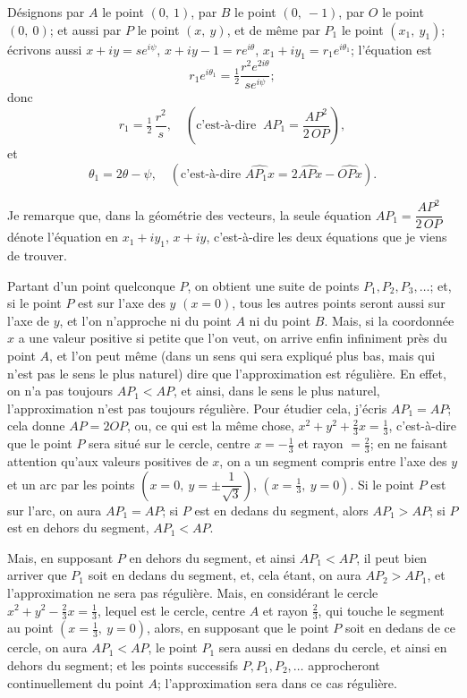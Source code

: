 \documentclass[11pt,a4paper]{article}
\begin{document}
Désignons par $A$ le point $(0,\ 1)$, par $B$ le point $(0,\ -1)$, par $O$ le point $(0,\ 0)$; et aussi par $P$ le point $(x,\ y)$, et de même par $P_1$ le point $(x_1,\ y_1)$; écrivons aussi $x + iy = s e^{i\psi}$, $x + iy - 1 = r e^{i\theta}$, $x_1 + i y_1 = r_1 e^{i\theta_1}$; l'équation est
\[
r_1 e^{i\theta_1} = \tfrac{1}{2} \frac{r^2 e^{2i\theta}}{s e^{i\psi}};
\]
donc
\[
r_1 = \tfrac{1}{2}\,\frac{r^2}{s},\quad (\text{c'est-à-dire }\ AP_1 = \frac{AP^2}{2\,OP}),
\]
et
\[
\theta_1 = 2\theta - \psi,\quad (\text{c'est-à-dire }\widehat{AP_1 x} = 2\widehat{APx} - \widehat{OPx}).
\]

Je remarque que, dans la géométrie des vecteurs, la seule équation $AP_1 = \dfrac{AP^2}{2\,OP}$ dénote l'équation en $x_1 + i y_1$, $x + iy$, c'est-à-dire les deux équations que je viens de trouver.

Partant d'un point quelconque $P$, on obtient une suite de points $P_1, P_2, P_3, \ldots$; et, si le point $P$ est sur l'axe des $y$ $(x = 0)$, tous les autres points seront aussi sur l'axe de $y$, et l'on n'approche ni du point $A$ ni du point $B$. Mais, si la coordonnée $x$ a une valeur positive si petite que l'on veut, on arrive enfin infiniment près du point $A$, et l'on peut même (dans un sens qui sera expliqué plus bas, mais qui n'est pas le sens le plus naturel) dire que l'approximation est régulière. En effet, on n'a pas toujours $AP_1 < AP$, et ainsi, dans le sens le plus naturel, l'approximation n'est pas toujours régulière. Pour étudier cela, j'écris $AP_1 = AP$; cela donne $AP = 2OP$, ou, ce qui est la même chose, $x^2 + y^2 + \tfrac{2}{3} x = \tfrac{1}{3}$, c'est-à-dire que le point $P$ sera situé sur le cercle, centre $x = -\tfrac{1}{3}$ et rayon $= \tfrac{2}{3}$; en ne faisant attention qu'aux valeurs positives de $x$, on a un segment compris entre l'axe des $y$ et un arc par les points $\left(x = 0,\ y = \pm \dfrac{1}{\sqrt{3}}\right)$, $(x = \tfrac{1}{3},\ y = 0)$. Si le point $P$ est sur l'arc, on aura $AP_1 = AP$; si $P$ est en dedans du segment, alors $AP_1 > AP$; si $P$ est en dehors du segment, $AP_1 < AP$.

Mais, en supposant $P$ en dehors du segment, et ainsi $AP_1 < AP$, il peut bien arriver que $P_1$ soit en dedans du segment, et, cela étant, on aura $AP_2 > AP_1$, et l'approximation ne sera pas régulière. Mais, en considérant le cercle $x^2 + y^2 - \tfrac{2}{3} x = \tfrac{1}{3}$, lequel est le cercle, centre $A$ et rayon $\tfrac{2}{3}$, qui touche le segment au point $(x = \tfrac{1}{3},\ y = 0)$, alors, en supposant que le point $P$ soit en dedans de ce cercle, on aura $AP_1 < AP$, le point $P_1$ sera aussi en dedans du cercle, et ainsi en dehors du segment; et les points successifs $P, P_1, P_2, \ldots$ approcheront continuellement du point $A$; l'approximation sera dans ce cas régulière.
\end{document}
